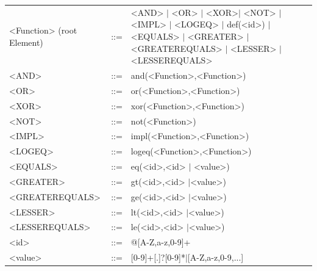 \documentclass[a4paper,10pt]{book}
\newcommand{\htmlTag}[1]{\textless #1\textgreater}
\begin{document}
\begin{tabularx}{\textwidth}{lcX}
\htmlTag{Function} (root Element) & ::= & \htmlTag{AND} $\vert$ \htmlTag{OR} $\vert$ \htmlTag{XOR}$\vert$ \htmlTag{NOT} $\vert$ \htmlTag{IMPL} $\vert$ \htmlTag{LOGEQ} $\vert$ def(\htmlTag{id}) $\vert$ \htmlTag{EQUALS} $\vert$ \htmlTag{GREATER} $\vert$ \htmlTag{GREATEREQUALS} $\vert$ \htmlTag{LESSER} $\vert$ \htmlTag{LESSEREQUALS} \\ [0.1cm]

\htmlTag{AND}          & ::= & and(\htmlTag{Function},\htmlTag{Function})\\ [0.1cm]

\htmlTag{OR}           & ::= & or(\htmlTag{Function},\htmlTag{Function})\\ [0.1cm]

\htmlTag{XOR}          & ::= & xor(\htmlTag{Function},\htmlTag{Function})\\ [0.1cm]

\htmlTag{NOT}          & ::= & not(\htmlTag{Function})\\ [0.1cm]

\htmlTag{IMPL}         & ::= & impl(\htmlTag{Function},\htmlTag{Function})\\ [0.1cm]

\htmlTag{LOGEQ}        & ::= & logeq(\htmlTag{Function},\htmlTag{Function})\\ [0.1cm]

\htmlTag{EQUALS}       & ::= & eq(\htmlTag{id},\htmlTag{id} $\vert$ \htmlTag{value})\\ [0.1cm]

\htmlTag{GREATER}      & ::= & gt(\htmlTag{id},\htmlTag{id} $\vert$\htmlTag{value})\\ [0.1cm]

\htmlTag{GREATEREQUALS}& ::= & ge(\htmlTag{id},\htmlTag{id} $\vert$\htmlTag{value})\\ [0.1cm]

\htmlTag{LESSER}       & ::= & lt(\htmlTag{id},\htmlTag{id} $\vert$\htmlTag{value})\\ [0.1cm]

\htmlTag{LESSEREQUALS} & ::= & le(\htmlTag{id},\htmlTag{id} $\vert$\htmlTag{value})\\ [0.1cm]

\htmlTag{id}           & ::= & @[A-Z,a-z,0-9]+\\ [0.1cm]

\htmlTag{value}        & ::= & [0-9]+[.]?[0-9]*$\vert$[A-Z,a-z,0-9,...]\\ [0.1cm]
\end{tabularx}
\end{document}
